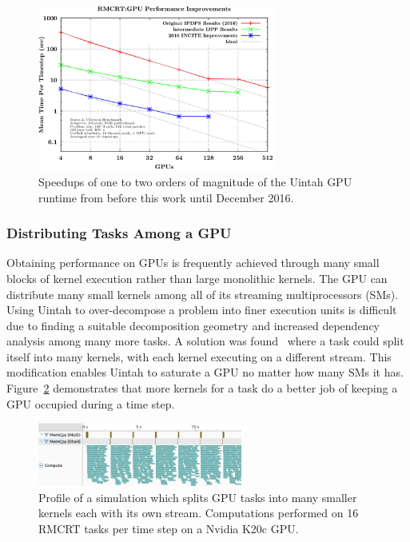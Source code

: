 \documentclass[12pt]{article}
\begin{document}
\begin{figure}
	\centering
	\includegraphics[width=0.70\textwidth]{figures/rmcrt-cumulative.png}
	\caption{Speedups of one to two orders of magnitude of the Uintah GPU runtime from before this work until December 2016.   }
	\label{fig:rmcrt-cumulative}
\end{figure}

\subsubsection{Distributing Tasks Among a GPU}
\label{ch:generalizing_task_execution}
Obtaining performance on GPUs is frequently achieved through many small blocks of kernel execution rather than large monolithic kernels.  The GPU can distribute many small kernels among all of its streaming multiprocessors (SMs).  Using Uintah to over-decompose a problem into finer execution units is difficult due to finding a suitable decomposition geometry and increased dependency analysis among many more tasks.  A solution was found~\cite{espm2-brad} where a task could split itself into many kernels, with each kernel executing on a different stream.  This modification enables Uintah to saturate a GPU no matter how many SMs it has.   Figure~\ref{fig:rmcrt-distributing-tasks} demonstrates that more kernels for a task do a better job of keeping a GPU occupied during a time step.    

\begin{figure}
	\centering
	\includegraphics[width=0.60\textwidth]{figures/phaseiii-multistream-300rays-28x28x56_8threads_6streams_crop.png}
	\caption{Profile of a simulation which splits GPU tasks into many smaller kernels each with its own stream.  Computations performed on 16 RMCRT tasks per time step on a Nvidia K20c GPU.   }
	\label{fig:rmcrt-distributing-tasks}
\end{figure}
\end{document}
